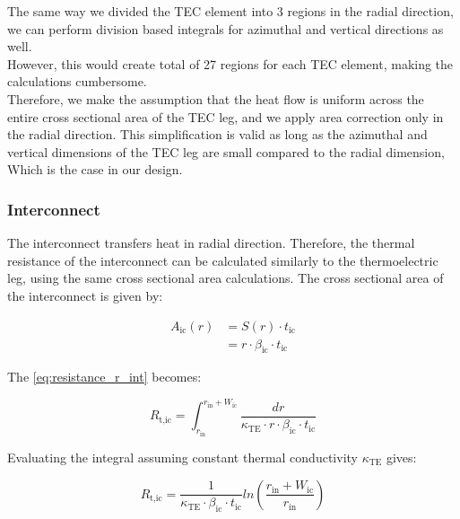 \documentclass[10pt,a4paper,twocolumn]{article}
\newenvironment{customnote}[1][]{
    \begin{tcolorbox}[NoteBox, #1]
}{
    \end{tcolorbox}
}
\begin{document}
\begin{customnote}
  The same way we divided the TEC element into 3 regions in the radial direction, we can perform division based integrals for azimuthal and vertical directions as well.\\

  However, this would create total of 27 regions for each TEC element, making the calculations cumbersome.\\

  Therefore, we make the assumption that the heat flow is uniform across the entire cross sectional area of the TEC leg, and we apply area correction only in the radial direction. This simplification is valid as long as the azimuthal and vertical dimensions of the TEC leg are small compared to the radial dimension, Which is the case in our design.\\
\end{customnote}

\subsubsection{Interconnect}

The interconnect transfers heat in radial direction. Therefore, the thermal resistance of the interconnect can be calculated similarly to the thermoelectric leg, using the same cross sectional area calculations. The cross sectional area of the interconnect is given by:

\begin{equation*}
  \begin{aligned}
    A_{\text{ic}}(r) & = S(r)\cdot t_{\text{ic}}                       \\
                     & = r \cdot \beta_{\text{ic}} \cdot t_{\text{ic}}
  \end{aligned}
\end{equation*}

The \cref{eq:resistance_r_int} becomes:

\begin{equation*}
  R_{\text{t,ic}} = \int_{r_{\text{in}}}^{r_{\text{in}}+W_{\text{ic}}} \frac{dr}{\kappa_{\text{TE}} \cdot r \cdot \beta_{\text{ic}} \cdot t_{\text{ic}}}
\end{equation*}

Evaluating the integral assuming constant thermal conductivity $\kappa_{\text{TE}}$ gives:

\begin{equation}
  R_{\text{t,ic}} = \frac{1}{\kappa_{\text{TE}} \cdot \beta_{\text{ic}} \cdot t_{\text{ic}}} ln\left( \frac{r_{\text{in}} + W_{\text{ic}}}{r_{\text{in}}} \right)
\end{equation}
\end{document}
